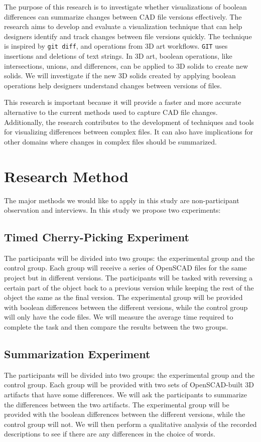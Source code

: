 \documentclass[sigconf,authorversion,nonacm]{acmart}
\begin{document}
The purpose of this research is to investigate whether visualizations of boolean differences can summarize changes between CAD file versions effectively. The research aims to develop and evaluate a visualization technique that can help designers identify and track changes between file versions quickly. The technique is inspired by \texttt{git diff}, and operations from 3D art workflows. \texttt{GIT} uses insertions and deletions of text strings. In 3D art, boolean operations, like intersections, unions, and differences, can be applied to 3D solids to create new solids. We will investigate if the new 3D solids created by applying boolean operations help designers understand changes between versions of files.

This research is important because it will provide a faster and more accurate alternative to the current methods used to capture CAD file changes. Additionally, the research contributes to the development of techniques and tools for visualizing differences between complex files. It can also have implications for other domains where changes in complex files should be summarized.

\section{Research Method}

The major methods we would like to apply in this study are non-participant observation and interviews. In this study we propose two experiments:

\subsection{Timed Cherry-Picking Experiment}
The participants will be divided into two groups: the experimental group and the control group. Each group will receive a series of OpenSCAD files for the same project but in different versions. The participants will be tasked with reversing a certain part of the object back to a previous version while keeping the rest of the object the same as the final version. The experimental group will be provided with boolean differences between the different versions, while the control group will only have the code files. We will measure the average time required to complete the task and then compare the results between the two groups.

\subsection{Summarization Experiment}
The participants will be divided into two groups: the experimental group and the control group. Each group will be provided with two sets of OpenSCAD-built 3D artifacts that have some differences. We will ask the participants to summarize the differences between the two artifacts. The experimental group will be provided with the boolean differences between the different versions, while the control group will not. We will then perform a qualitative analysis of the recorded descriptions to see if there are any differences in the choice of words.
\end{document}

